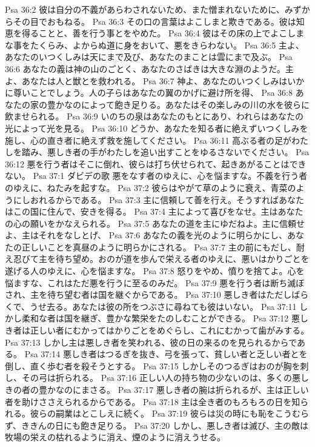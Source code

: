 Psa 36:2  彼は自分の不義があらわされないため、また憎まれないために、みずからその目でおもねる。
Psa 36:3  その口の言葉はよこしまと欺きである。彼は知恵を得ることと、善を行う事とをやめた。
Psa 36:4  彼はその床の上でよこしまな事をたくらみ、よからぬ道に身をおいて、悪をきらわない。
Psa 36:5  主よ、あなたのいつくしみは天にまで及び、あなたのまことは雲にまで及ぶ。
Psa 36:6  あなたの義は神の山のごとく、あなたのさばきは大きな淵のようだ。主よ、あなたは人と獣とを救われる。
Psa 36:7  神よ、あなたのいつくしみはいかに尊いことでしょう。人の子らはあなたの翼のかげに避け所を得、
Psa 36:8  あなたの家の豊かなのによって飽き足りる。あなたはその楽しみの川の水を彼らに飲ませられる。
Psa 36:9  いのちの泉はあなたのもとにあり、われらはあなたの光によって光を見る。
Psa 36:10  どうか、あなたを知る者に絶えずいつくしみを施し、心の直き者に絶えず救を施してください。
Psa 36:11  高ぶる者の足がわたしを踏み、悪しき者の手がわたしを追い出すことをゆるさないでください。
Psa 36:12  悪を行う者はそこに倒れ、彼らは打ち伏せられて、起きあがることはできない。
Psa 37:1  ダビデの歌 悪をなす者のゆえに、心を悩ますな。不義を行う者のゆえに、ねたみを起すな。
Psa 37:2  彼らはやがて草のように衰え、青菜のようにしおれるからである。
Psa 37:3  主に信頼して善を行え。そうすればあなたはこの国に住んで、安きを得る。
Psa 37:4  主によって喜びをなせ。主はあなたの心の願いをかなえられる。
Psa 37:5  あなたの道を主にゆだねよ。主に信頼せよ、主はそれをなしとげ、
Psa 37:6  あなたの義を光のように明らかにし、あなたの正しいことを真昼のように明らかにされる。
Psa 37:7  主の前にもだし、耐え忍びて主を待ち望め。おのが道を歩んで栄える者のゆえに、悪いはかりごとを遂げる人のゆえに、心を悩ますな。
Psa 37:8  怒りをやめ、憤りを捨てよ。心を悩ますな、これはただ悪を行うに至るのみだ。
Psa 37:9  悪を行う者は断ち滅ぼされ、主を待ち望む者は国を継ぐからである。
Psa 37:10  悪しき者はただしばらくで、うせ去る。あなたは彼の所をつぶさに尋ねても彼はいない。
Psa 37:11  しかし柔和な者は国を継ぎ、豊かな繁栄をたのしむことができる。
Psa 37:12  悪しき者は正しい者にむかってはかりごとをめぐらし、これにむかって歯がみする。
Psa 37:13  しかし主は悪しき者を笑われる、彼の日の来るのを見られるからである。
Psa 37:14  悪しき者はつるぎを抜き、弓を張って、貧しい者と乏しい者とを倒し、直く歩む者を殺そうとする。
Psa 37:15  しかしそのつるぎはおのが胸を刺し、その弓は折られる。
Psa 37:16  正しい人の持ち物の少ないのは、多くの悪しきの者の豊かなのにまさる。
Psa 37:17  悪しき者の腕は折られるが、主は正しい者を助けささえられるからである。
Psa 37:18  主は全き者のもろもろの日を知られる。彼らの嗣業はとこしえに続く。
Psa 37:19  彼らは災の時にも恥をこうむらず、ききんの日にも飽き足りる。
Psa 37:20  しかし、悪しき者は滅び、主の敵は牧場の栄えの枯れるように消え、煙のように消えうせる。

